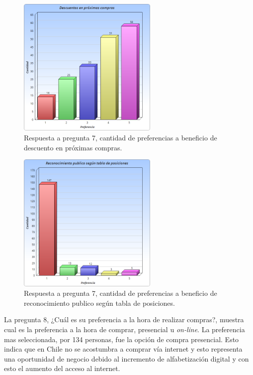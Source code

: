 \begin{figure}[!htb]
  \centering
  \includegraphics[width=0.6\textwidth]{images/Graficos/graf_5_7.png}
  \caption[chart5.7]{Respuesta a pregunta 7, cantidad de preferencias a beneficio de descuento en
próximas compras.}
  \label{fig:chart5.7}
\end{figure}

\begin{figure}[!htb]
  \centering
  \includegraphics[width=0.6\textwidth]{images/Graficos/graf_5_8.png}
  \caption[chart5.8]{Respuesta a pregunta 7, cantidad de preferencias a beneficio de reconocimiento
publico según tabla de posiciones.}
  \label{fig:chart5.8}
\end{figure}


La pregunta 8,
¿Cuál es su preferencia a la hora de realizar compras?,
muestra cual es la preferencia a la hora de comprar, presencial u \emph{on-line}.
La preferencia mas seleccionada, por 134 personas, fue la opción de compra
presencial.
Esto indica que en Chile no se acostumbra a comprar vía internet y esto representa
una oportunidad de negocio debido al incremento de alfabetización digital y
con esto el aumento del acceso al internet.

